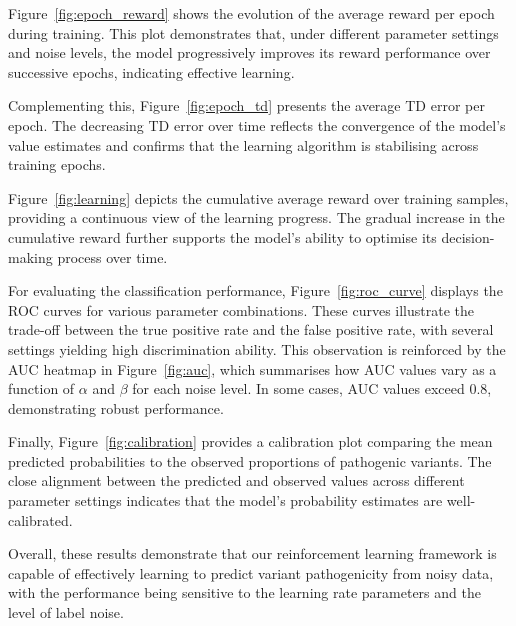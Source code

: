Figure~\ref{fig:epoch_reward} shows the evolution of the average reward per epoch during training. This plot demonstrates that, under different parameter settings and noise levels, the model progressively improves its reward performance over successive epochs, indicating effective learning.

Complementing this, Figure~\ref{fig:epoch_td} presents the average TD error per epoch. The decreasing TD error over time reflects the convergence of the model’s value estimates and confirms that the learning algorithm is stabilising across training epochs.

Figure~\ref{fig:learning} depicts the cumulative average reward over training samples, providing a continuous view of the learning progress. The gradual increase in the cumulative reward further supports the model's ability to optimise its decision-making process over time.

For evaluating the classification performance, Figure~\ref{fig:roc_curve} displays the ROC curves for various parameter combinations. These curves illustrate the trade-off between the true positive rate and the false positive rate, with several settings yielding high discrimination ability. This observation is reinforced by the AUC heatmap in Figure~\ref{fig:auc}, which summarises how AUC values vary as a function of $\alpha$ and $\beta$ for each noise level. In some cases, AUC values exceed 0.8, demonstrating robust performance.

Finally, Figure~\ref{fig:calibration} provides a calibration plot comparing the mean predicted probabilities to the observed proportions of pathogenic variants. The close alignment between the predicted and observed values across different parameter settings indicates that the model’s probability estimates are well-calibrated.

Overall, these results demonstrate that our reinforcement learning framework is capable of effectively learning to predict variant pathogenicity from noisy data, with the performance being sensitive to the learning rate parameters and the level of label noise.

